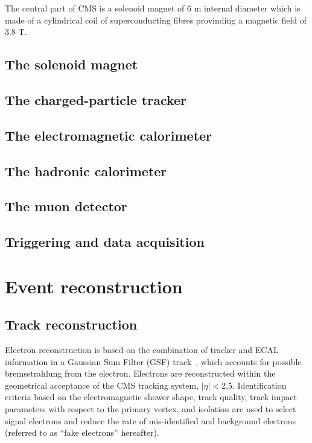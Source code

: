 \clearpage
The central part of CMS is a solenoid magnet of 6 m internal diameter
which is made of a cylindrical coil of superconducting fibres
provinding a magnetic field of 3.8 T. 
\subsection{The solenoid magnet} 
\subsection{The charged-particle tracker} 
\subsection{The electromagnetic calorimeter} 
\subsection{The hadronic calorimeter} 
\subsection{The muon detector} 
\subsection{Triggering and data acquisition} 
\section{Event reconstruction}\label{sec:reconstruction}
\subsection{Track reconstruction} 
Electron reconstruction is based on the combination of tracker and
ECAL information in a Gaussian Sum Filter (GSF)
track~\cite{Khachatryan:2015hwa}, which accounts for possible
bremsstrahlung from the electron.
Electrons are reconstructed within the geometrical acceptance of the
CMS tracking system, $|\eta|<2.5$.
Identification criteria based on the electromagnetic shower shape, track
quality, track impact parameters with respect to the primary vertex,
and isolation are used to select signal electrons and reduce the rate
of mis-identified and background electrons (referred to as ``fake
electrons'' hereafter).

